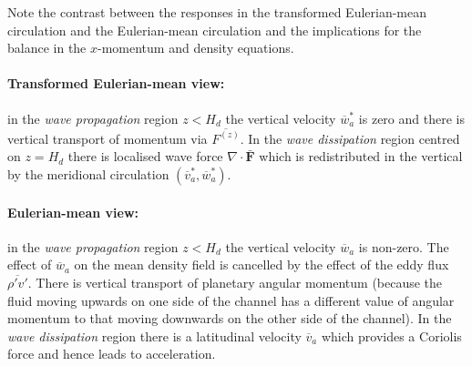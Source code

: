 \documentclass{jknotes}
\begin{document}
{
}

Note the contrast between the responses in the transformed Eulerian-mean
circulation and the Eulerian-mean circulation and the implications for the
balance in the $x$-momentum and density equations.

\paragraph{Transformed Eulerian-mean view:} in the \emph{wave propagation}
region $z < H_d$ the vertical velocity $\overline{w}_a^*$ is zero and there is
vertical transport of momentum via $\overline{F^{(z)}}$. In the \emph{wave
dissipation} region centred on $z=H_d$ there is localised wave force $\nabla
\cdot \bar{\symbf{F}}$ which is redistributed in the vertical by the
meridional circulation $(\overline{v}_a^*, \overline{w}_a^*)$. 

\paragraph{Eulerian-mean view:} in the \emph{wave propagation} region $z <
H_d$ the vertical velocity $\overline{w}_a$ is non-zero. The effect of
$\overline{w}_a$ on the mean density field is cancelled by the effect of the
eddy flux $\overline{\rho'v'}$. There is vertical transport of planetary
angular momentum (because the fluid moving upwards on one side of the channel
has a different value of angular momentum to that moving downwards on the
other side of the channel). In the \emph{wave dissipation} region there is a
latitudinal velocity $\overline{v}_a$ which provides a Coriolis force and
hence leads to acceleration.
\end{document}
